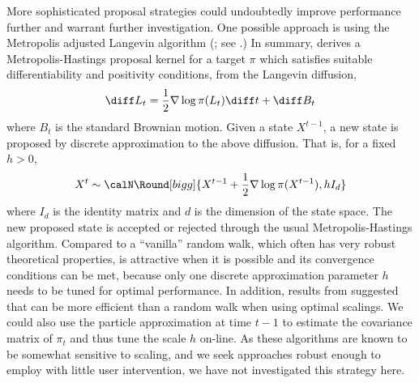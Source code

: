 More sophisticated proposal strategies could undoubtedly improve performance further and warrant further investigation. One possible approach is using the Metropolis adjusted Langevin algorithm (\mala; see \cite{Roberts:1996vd}.) In summary, \mala derives a Metropolis-Hastings proposal kernel for a target $\pi$ which satisfies suitable differentiability and positivity conditions, from the Langevin diffusion,
\begin{equation*}
  \diff L_t = \frac{1}{2}\nabla\log\pi(L_t)\diff t + \diff B_t
\end{equation*}
where $B_t$ is the standard Brownian motion. Given a state $X^{t-1}$, a new state is proposed by discrete approximation to the above diffusion. That is, for a fixed $h>0$,
\begin{equation}
  X^t\sim\calN\Round[bigg]{X^{t-1}+\frac{1}{2}\nabla\log\pi(X^{t-1}), hI_d}
\end{equation}
where $I_d$ is the identity matrix and $d$ is the dimension of the state space. The new proposed state is accepted or rejected through the usual Metropolis-Hastings algorithm. Compared to a ``vanilla'' random walk, which often has very robust theoretical properties, \mala is attractive when it is possible and its convergence conditions \cite{Roberts:1996vd} can be met, because only one discrete approximation parameter $h$ needs to be tuned for optimal performance. In addition, results from \cite{Roberts:2001ta} suggested that \mala can be more efficient than a random walk when using optimal scalings. We could also use the particle approximation at time $t - 1$ to estimate the covariance matrix of $\pi_t$ and thus tune the scale $h$ on-line. As these algorithms are known to be somewhat sensitive to scaling, and we seek approaches robust enough to employ with little user intervention, we have not investigated this strategy here.




